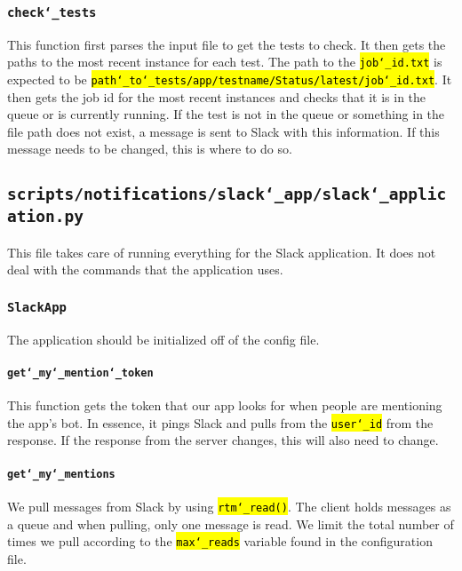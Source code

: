 \documentclass{article}
\newcommand{\un}[0]{\char`_}
\newcommand{\code}[1]{\textcolor{red}{\hl{\texttt{#1}}}}
\begin{document}
\subsubsection{\texttt{check\un tests}}

This function first parses the input file to get the tests to check. It then gets the paths to the most recent instance for each test. The path to the \code{job\un id.txt} is expected to be \code{path\un to\un tests/app/testname/Status/latest/job\un id.txt}. It then gets the job id for the most recent instances and checks that it is in the queue or is currently running. If the test is not in the queue or something in the file path does not exist, a message is sent to Slack with this information. If this message needs to be changed, this is where to do so.

\subsection{\texttt{scripts/notifications/slack\un app/slack\un application.py}}

This file takes care of running everything for the Slack application. It does not deal with the commands that the application uses.

\subsubsection{\texttt{SlackApp}}

The application should be initialized off of the config file.

\paragraph{\texttt{get\un my\un mention\un token}}

This function gets the token that our app looks for when people are mentioning the app's bot. In essence, it pings Slack and pulls from the \code{user\un id} from the response. If the response from the server changes, this will also need to change.

\paragraph{\texttt{get\un my\un mentions}}

We pull messages from Slack by using \code{rtm\un read()}. The client holds messages as a queue and when pulling, only one message is read. We limit the total number of times we pull according to the \code{max\un reads} variable found in the configuration file.
\end{document}
